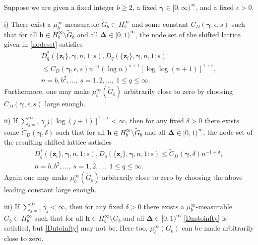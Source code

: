 \documentclass{article}
\renewcommand{\vec}[1]{\ensuremath{\mathbf{#1}}}
\newcommand{\vecsym}[1]{\ensuremath{\boldsymbol{#1}}}
\newcommand{\bfgam}{\vecsym \gamma}
\newcommand{\bfDelta}{\vecsym \Delta}
\newcommand{\Cinf}{[0,1)^{\infty}}
\newcommand{\h}{\vec h}
\newcommand{\z}{\vec z}
\begin{document}
\begin{theorem} \label{Dthm} Suppose we are given a fixed integer $b \ge
2$, a fixed $\bfgam \in [0,\infty)^{\infty}$, 
and a fixed $\epsilon > 0$.  

i) There exist a $\mu_b^{\infty}$-measurable $\tilde{G}_{b} \subset H_{b}^{\infty}$ and some constant
$C_{D}(\bfgam,\epsilon,s)$ such that for all $\h \in
H_{b}^{\infty} \setminus \tilde{G}_{b}$ and all $\bfDelta \in \Cinf$, the node set
of the shifted lattice given in \eqref{nodeset} satisfies
\begin{multline} \label{Dntoinfty}
    D^{*}_{q}(\{\z_{i}\},\bfgam,n,1:s), D_{q}(\{\z_{i}\},\bfgam,n,1:s) \\ \le
    C_{D}(\bfgam,\epsilon,s) n^{-1} (\log n)^{s+1} [\log \log (
    n+1)]^{1+\epsilon}, \\ n=b, b^{2},\ldots,\ s=1,2,\ldots,\ 1 \le q \le \infty.
\end{multline}
Furthermore, one may make $\mu_{b}^{\infty}(\tilde{G}_{b})$ arbitrarily close to 
zero by choosing  $C_{D}(\bfgam,\epsilon,s)$ large enough.

ii) If $\sum_{j=1}^{\infty} \gamma_{j} j [\log(j+1)]^{1+\epsilon} < \infty$, then for
any fixed $\delta>0$ there exists some
$\tilde{C}_{D}(\bfgam,\delta)$ such that for all $\h \in
H_{b}^{\infty} \setminus \tilde{G}_{b}$ and all $\bfDelta \in \Cinf$, the node set 
of the resulting shifted lattice satisfies
\begin{multline}\label{Dnstoinfty}
D^{*}_{q}(\{\z_{i}\},\bfgam,n,1:s), D_{q}(\{\z_{i}\},\bfgam,n,1:s) \le
\tilde{C}_{D}(\bfgam,\delta) n^{-1+\delta}, \\ 
n=b,b^{2},\ldots,\ s=1,2,\ldots,\ 1 \le q \le \infty.
\end{multline}
Again one may make $\mu_{b}^{\infty}(\tilde{G}_{b})$ arbitrarily close to 
zero by choosing the above leading constant large enough.

iii) If $\sum_{j=1}^{\infty} \gamma_{j} < \infty$, then for any fixed
$\delta>0$ there exists a $\mu_b^{\infty}$-measurable $G_{b} \subset H_{b}^{\infty}$ such that
for all $\h \in H_{b}^{\infty} \setminus G_{b}$ and all $\bfDelta \in
\Cinf$ \eqref{Dnstoinfty} is satisfied, but \eqref{Dntoinfty} may not
be.  Here too, $\mu_{b}^{\infty}(G_{b})$ can be made arbitrarily close
to zero.
\end{theorem}
\end{document}
